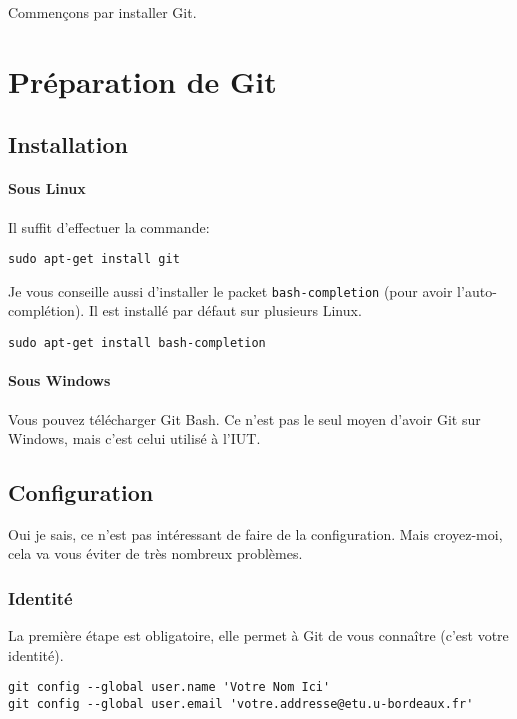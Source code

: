 \documentclass[10pt,a4paper]{article}
\begin{document}
Commençons par installer Git.

\section{Préparation de Git}

\subsection{Installation}

\paragraph{Sous Linux}

Il suffit d'effectuer la commande:

\begin{verbatim}
sudo apt-get install git
\end{verbatim}

Je vous conseille aussi d'installer le packet {\tt bash-completion} (pour avoir l'auto-complétion). Il est installé par défaut sur plusieurs Linux.

\begin{verbatim}
sudo apt-get install bash-completion
\end{verbatim}

\paragraph{Sous Windows}

Vous pouvez télécharger Git Bash. Ce n'est pas le seul moyen d'avoir Git sur Windows, mais c'est celui utilisé à l'IUT.

\subsection{Configuration\label{config}}

Oui je sais, ce n'est pas intéressant de faire de la configuration. Mais croyez-moi, cela va vous éviter de très nombreux problèmes.

\subsubsection{Identité}

La première étape est obligatoire, elle permet à Git de vous connaître (c'est votre identité).

\begin{verbatim}
git config --global user.name 'Votre Nom Ici'
git config --global user.email 'votre.addresse@etu.u-bordeaux.fr'
\end{verbatim}
\end{document}
